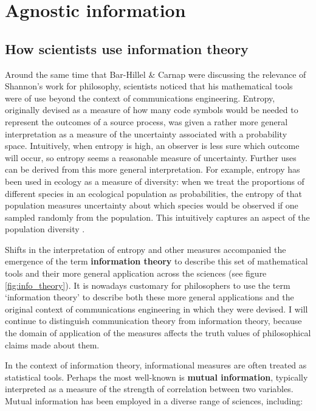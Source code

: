 \section{Agnostic information}\label{sec:agnostic}

\subsection{How scientists use information theory}\label{subsec:scientists}

Around the same time that Bar-Hillel \& Carnap were discussing the relevance of Shannon's work for philosophy, scientists noticed that his mathematical tools were of use beyond the context of communications engineering.
Entropy, originally devised as a measure of how many code symbols would be needed to represent the outcomes of a source process, was given a rather more general interpretation as a measure of the uncertainty associated with a probability space.
Intuitively, when entropy is high, an observer is less sure which outcome will occur, so entropy seems a reasonable measure of uncertainty.
Further uses can be derived from this more general interpretation.
For example, entropy has been used in ecology as a measure of diversity: when we treat the proportions of different species in an ecological population as probabilities, the entropy of that population measures uncertainty about which species would be observed if one sampled randomly from the population.
This intuitively captures an aspect of the population diversity \citep{margalef1957information}.

Shifts in the interpretation of entropy and other measures accompanied the emergence of the term \textbf{information theory} to describe this set of mathematical tools and their more general application across the sciences (see figure \ref{fig:info_theory}).
It is nowadays customary for philosophers to use the term `information theory' to describe both these more general applications and the original context of communications engineering in which they were devised.
I will continue to distinguish communication theory from information theory, because the domain of application of the measures affects the truth values of philosophical claims made about them. %



In the context of information theory, informational measures are often treated as statistical tools.
Perhaps the most well-known is \textbf{mutual information}, typically interpreted as a measure of the strength of correlation between two variables.
Mutual information has been employed in a diverse range of sciences, including:

